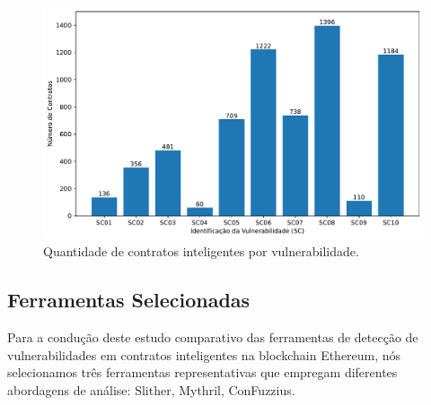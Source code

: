 \documentclass[12pt]{article}
\begin{document}
\begin{figure}[!ht]
    \centering
    \includegraphics[width=0.75\linewidth]{images/grafico_dataset.pdf}
    \caption{Quantidade de contratos inteligentes por vulnerabilidade.}
    \label{fig:grafico_dataset}
\end{figure}

\subsection{Ferramentas Selecionadas}\label{subsec:selectedtools}

Para a condução deste estudo comparativo das ferramentas de detecção de vulnerabilidades em contratos inteligentes na blockchain Ethereum, nós selecionamos três ferramentas representativas que empregam diferentes abordagens de análise: Slither, Mythril, ConFuzzius.


\end{document}
